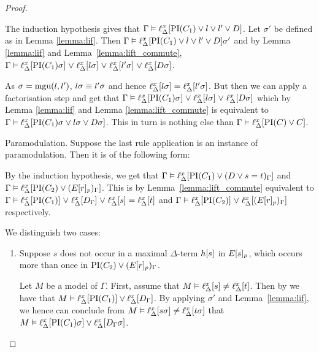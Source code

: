 \begin{proof}
\begin{description}
			The induction hypothesis gives that
			$\Gamma \vDash \ell_{\Delta}^{x}[\operatorname{PI}(C_1) \lor l \lor l' \lor D]$.
			Let $\sigma'$ be defined as in Lemma \ref{lemma:lif}.
			Then $\Gamma \vDash \ell_{\Delta}^{x}[\operatorname{PI}(C_1) \lor l \lor l' \lor D]\sigma'$ and by Lemma \ref{lemma:lif} and Lemma~\ref{lemma:lift_commute},
			$\Gamma \vDash \ell_{\Delta}^{x}[\operatorname{PI}(C_1)\sigma] \;{\lor}\; \ell_{\Delta}^{x}[l\sigma] \;{\lor}\; \ell_{\Delta}^{x}[l'\sigma] \;{\lor}\; \ell_{\Delta}^{x}[D\sigma]$.

			As $\sigma = \operatorname{mgu}(l, l')$, $l\sigma \equiv l'\sigma$ and hence $\ell_{\Delta}^{x}[l\sigma] = \ell_{\Delta}^{x}[l'\sigma]$.
			But then we can apply a factorisation step and get that
			$\Gamma \vDash \ell_{\Delta}^{x}[\operatorname{PI}(C_1)\sigma] \;{\lor}\; \ell_{\Delta}^{x}[l\sigma] \;{\lor}\; \ell_{\Delta}^{x}[D\sigma]$
			which by Lemma \ref{lemma:lif} and Lemma \ref{lemma:lift_commute} is equivalent to 
			$\Gamma \entails\nolinebreak \lifdelta{\PI(C_1)\sigma \lor l\sigma \lor D\sigma}$.
			This in turn is nothing else than $\Gamma \vDash \ell_{\Delta}^{x}[\operatorname{PI}(C) \lor C]$.

		\item{Paramodulation.}
			Suppose the last rule application is an instance of paramodulation. Then it is of the following form:
			\begin{prooftree}
			\end{prooftree}
			By the induction hypothesis, we get that 
			$\Gamma \vDash \ell_{\Delta}^{x}[\operatorname{PI}(C_1) \lor (D\lor s=t)_\Gamma]$ and 
			$\Gamma \vDash \ell_{\Delta}^{x}[\operatorname{PI}(C_2) \lor (E{[r]_{p}})_\Gamma]$.
			This is by Lemma~\ref{lemma:lift_commute} equivalent to
			\markA{} $\Gamma \vDash \ell_{\Delta}^{x}[\operatorname{PI}(C_1)] \;{\lor}\;\allowbreak \ell_{\Delta}^{x}[D_\Gamma] \;{\lor}\; \ell_{\Delta}^{x}[s] = \ell_{\Delta}^{x}[t]$
			and \markB{} 
			$\Gamma \vDash \ell_{\Delta}^{x}[\operatorname{PI}(C_2)] \;{\lor}\; \ell_{\Delta}^{x}[(E{[r]_{p}})_\Gamma]$ respectively.


			We distinguish two cases:\nopagebreak
			\begin{enumerate}
				\item Suppose $s$ does not occur in a maximal $\Delta$-term $h[s]$ in $E{[s]_{p}}$, which occurs more than once in $\operatorname{PI}(C_2) \lor (E{[r]_{p}})_\Gamma$.
					\label{klehjy}

					Let $M$ be a model of $\Gamma$.
					First, assume that $M \vDash \ell_{\Delta}^{x}[s] \neq \ell_{\Delta}^{x}[t]$.
					Then by \markA{} we have that $M \vDash \ell_{\Delta}^{x}[\operatorname{PI}(C_1)] \lor \ell_{\Delta}^{x}[D_\Gamma]$.
					By applying $\sigma'$ and Lemma~\ref{lemma:lif}, we hence can conclude from 
					$M \vDash \ell_{\Delta}^{x}[s\sigma] \neq \ell_{\Delta}^{x}[t\sigma]$ that 
					$M \vDash \ell_{\Delta}^{x}[\operatorname{PI}(C_1)\sigma] \lor \ell_{\Delta}^{x}[D_\Gamma\sigma]$.



\end{enumerate}
\end{description}
\end{proof}
